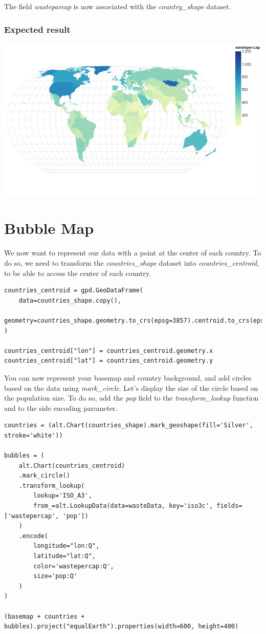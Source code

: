 \documentclass[11pt]{article}
\begin{document}
The field \textit{wasteparcap} is now associated with the \textit{country\_shape} dataset.

\subsubsection*{Expected result}

\begin{center}
\includegraphics[width=.6\textwidth]{visualization (5).png}
\end{center}

\section{Bubble Map}

We now want to represent our data with a point at the center of each country. To do so, we need to transform the \textit{countries\_shape} dataset into \textit{countries\_centroid}, to be able to access the center of each country.

\begin{verbatim}
countries_centroid = gpd.GeoDataFrame(
    data=countries_shape.copy(),
    geometry=countries_shape.geometry.to_crs(epsg=3857).centroid.to_crs(epsg=4326)
)

countries_centroid["lon"] = countries_centroid.geometry.x
countries_centroid["lat"] = countries_centroid.geometry.y
\end{verbatim}

You can now represent your basemap and country background, and add circles based on the data using \textit{mark\_circle}. Let's display the size of the circle based on the population size. To do so, add the \textit{pop} field to the \textit{transform\_lookup} function and to the side encoding parameter.

\begin{verbatim}
countries = (alt.Chart(countries_shape).mark_geoshape(fill='Silver', stroke='white'))

bubbles = (
    alt.Chart(countries_centroid)
    .mark_circle()
    .transform_lookup(
        lookup='ISO_A3',
        from_=alt.LookupData(data=wasteData, key='iso3c', fields=['wastepercap', 'pop'])
    )
    .encode(
        longitude="lon:Q",
        latitude="lat:Q",
        color='wastepercap:Q',
        size='pop:Q'
    )
)

(basemap + countries + bubbles).project("equalEarth").properties(width=600, height=400)
\end{verbatim}
\end{document}
